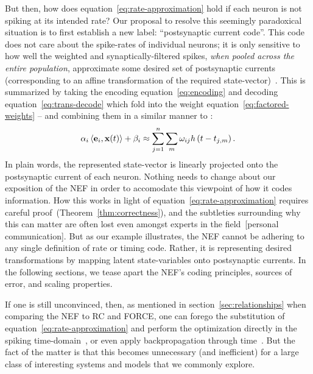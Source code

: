 But then, how does equation~\ref{eq:rate-approximation} hold if each neuron is not spiking at its intended rate?
Our proposal to resolve this seemingly paradoxical situation is to first establish a new label: ``postsynaptic current code''.
This code does not care about the spike-rates of individual neurons; it is only sensitive to how well the weighted and synaptically-filtered spikes, \emph{when pooled across the entire population}, approximate some desired set of postsynaptic currents (corresponding to an affine transformation of the required state-vector)~\citep{tripp2006neural}.
This is summarized by taking the encoding equation~\ref{eq:encoding} and decoding equation~\ref{eq:trans-decode} which fold into the weight equation~\ref{eq:factored-weights} -- and combining them in a similar manner to \citet{stoeckel2018}:
\begin{equation} \label{eq:psc-code}
\alpha_i \left\langle \mathbf{e}_i\text{,}\, \mathbf{x}(t) \right\rangle + \beta_i \approx \sum_{j=1}^n \sum_m \omega_{ij} h \left( t - t_{j\text{,}m} \right) \text{.}
\end{equation}
In plain words, the represented state-vector is linearly projected onto the postsynaptic current of each neuron. 
Nothing needs to change about our exposition of the NEF in order to accomodate this viewpoint of how it codes information.
How this works in light of equation~\ref{eq:rate-approximation} requires careful proof~(Theorem~\ref{thm:correctness}), and the subtleties surrounding why this can matter are often lost even amongst experts in the field~[personal communication].
But as our example illustrates, the NEF cannot be adhering to any single definition of rate or timing code.
Rather, it is representing desired transformations by mapping latent state-variables onto postsynaptic currents.  %
In the following sections, we tease apart the NEF's coding principles, sources of error, and scaling properties.

If one is still unconvinced, then, as mentioned in section~\ref{sec:relationships} when comparing the NEF to RC and FORCE, one can forego the substitution of equation~\ref{eq:rate-approximation} and perform the optimization directly in the spiking time-domain~\citep{voelker2016a, duggins2017incorporating}, or even apply backpropagation through time~\citep{rasmussen2018nengodl}.
But the fact of the matter is that this becomes unnecessary (and inefficient) for a large class of interesting systems and models that we commonly explore.

